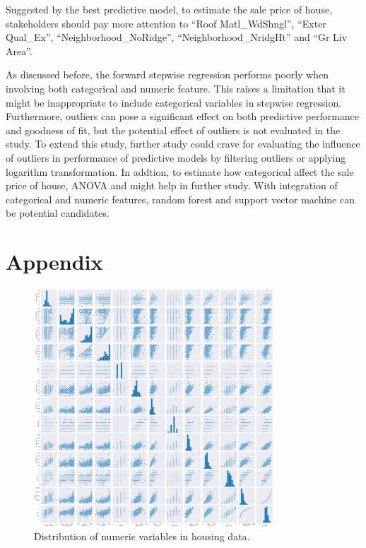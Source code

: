 \documentclass[letterpaper,12pt,twoside,]{pinp}
\begin{document}
Suggested by the best predictive model, to estimate the sale price of
house, stakeholders should pay more attention to ``Roof Matl\_WdShngl'',
``Exter Qual\_Ex'', ``Neighborhood\_NoRidge'', ``Neighborhood\_NridgHt''
and ``Gr Liv Area''.

As discussed before, the forward stepwise regression performs poorly
when involving both categorical and numeric feature. This raises a
limitation that it might be inappropriate to include categorical
variables in stepwise regression. Furthermore, outliers can pose a
significant effect on both predictive performance and goodness of fit,
but the potential effect of outliers is not evaluated in the study. To
extend this study, further study could crave for evaluating the
influence of outliers in performance of predictive models by filtering
outliers or applying logarithm transformation. In addtion, to estimate
how categorical affect the sale price of house, ANOVA and might help in
further study. With integration of categorical and numeric features,
random forest and support vector machine can be potential candidates.

\newpage

\hypertarget{appendix}{%
\section{Appendix}\label{appendix}}

\begin{figure}[h]
\includegraphics[width=0.8\textwidth]{scatter.png}
\centering
\caption{Distribution of numeric variables in housing data.}
\label{fig:scatter}
\end{figure}
\end{document}
